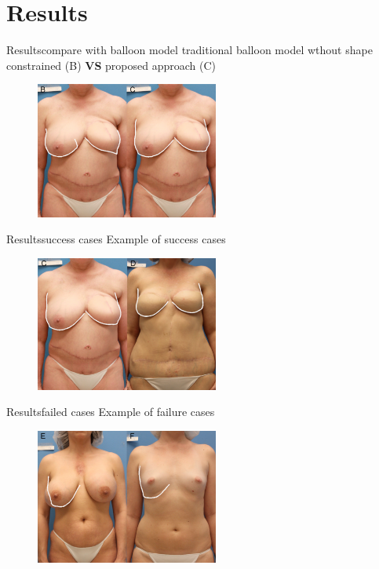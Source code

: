 \documentclass[10pt]{beamer}
\begin{document}
\section{Results}

\begin{frame}{Results}{compare with balloon model} 
traditional balloon model wthout shape constrained (B) \textbf{VS} proposed approach (C)
\begin{figure}[t]
	\includegraphics[width=6cm]{Feathergraphics/fig1BC}
	\centering
\end{figure}
\end{frame}

\begin{frame}{Results}{success cases} 
Example of success cases
\begin{figure}[t]
	\includegraphics[width=6cm]{Feathergraphics/fig1CD}
\end{figure}
\end{frame}

\begin{frame}{Results}{failed cases} 
Example of failure cases
\begin{figure}[t]
	\includegraphics[width=6cm]{Feathergraphics/fig1EF}
	\centering
\end{figure}
\end{frame}
\end{document}
